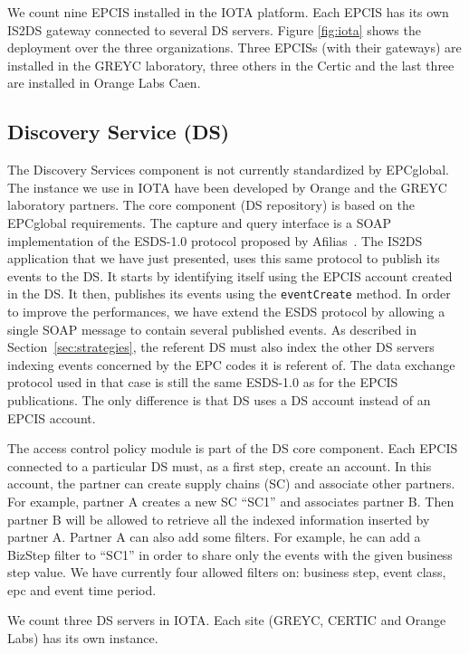 \documentclass[a4paper]{llncs}
\begin{document}
We count nine EPCIS installed in the IOTA platform. Each EPCIS has its own
IS2DS gateway connected to several DS servers. Figure \ref{fig:iota} shows the
deployment over the three organizations. Three EPCISs (with their gateways) are
installed in the GREYC laboratory, three others in the Certic and the last
three are installed in Orange Labs Caen.

\subsection{Discovery Service (DS)}
\label{subsec:DS}

The Discovery Services component is not currently standardized by
EPCglobal. The instance we use in IOTA have been developed by Orange and the
GREYC laboratory partners. The core component (DS repository) is based on the
EPCglobal requirements. The capture and query
interface is a SOAP 
implementation of the ESDS-1.0 protocol proposed by Afilias~\cite{afilias}. 
The IS2DS application that we have just presented, uses this same protocol to
publish its events to the DS. It starts by identifying itself using the EPCIS
account created in the DS. It then, publishes its events using the \texttt{eventCreate}
method. In order to improve the performances, we have extend the ESDS protocol
by allowing a single SOAP message to contain several published events. As
described in Section~\ref{sec:strategies}, the referent DS must also index the
other DS servers indexing events concerned by the EPC codes it is referent
of. The data exchange protocol used in that case is still the same ESDS-1.0
as for the EPCIS publications. The only difference is that DS uses a DS account
instead of an EPCIS account.

The access control policy module is part of the DS core component. Each EPCIS
connected to a particular DS must, as a first step, create an account. In this
account, the partner can create supply chains (SC) and associate other
partners. For example, partner A creates a new SC ``SC1'' and associates
partner B. Then partner B will be allowed to retrieve all the indexed
information inserted by partner A. Partner A can also add some filters. For
example, he can add a BizStep filter to ``SC1'' in order to share only the
events with the given business step value.  We have currently four allowed
filters on: business step, event class, epc and event time period.  

We count three DS servers in IOTA. Each site (GREYC, CERTIC and Orange Labs) has its own instance.
\end{document}
